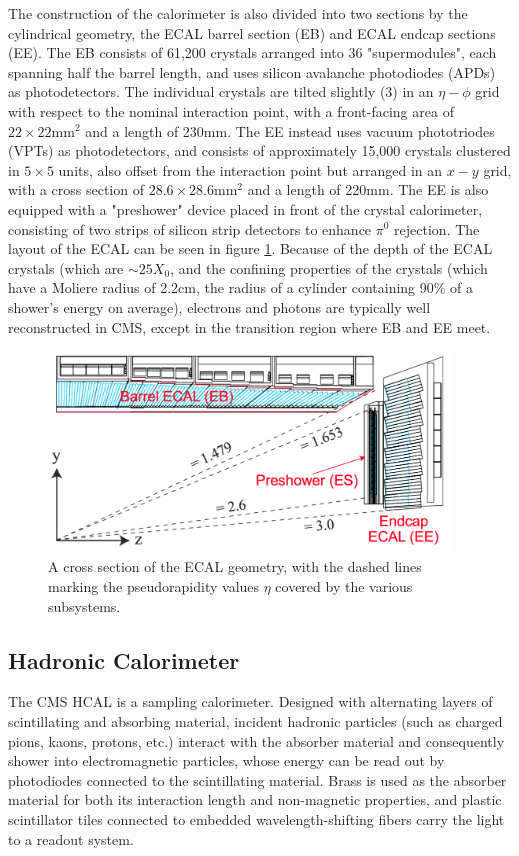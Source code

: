 The construction of the calorimeter is also divided into two sections by the cylindrical geometry, the ECAL barrel section (EB) and ECAL endcap sections (EE). The EB consists of 61,200 crystals arranged into 36 "supermodules", each spanning half the barrel length, and uses silicon avalanche photodiodes (APDs) as photodetectors. The individual crystals are tilted slightly (3\textdegree) in an $\eta-\phi$ grid with respect to the nominal interaction point, with a front-facing area of $22\times22\text{mm}^2$ and a length of 230mm. The EE instead uses vacuum phototriodes (VPTs) as photodetectors, and consists of approximately 15,000 crystals clustered in $5\times5$ units, also offset from the interaction point but arranged in an $x-y$ grid, with a cross section of $28.6\times28.6\text{mm}^2$ and a length of 220mm. The EE is also equipped with a "preshower" device placed in front of the crystal calorimeter, consisting of two strips of silicon strip detectors to enhance $\pi^0$ rejection. The layout of the ECAL can be seen in figure \ref{fig:ecalGeometry}. Because of the depth of the ECAL crystals (which are $\sim25X_0$, and the confining properties of the crystals (which have a Moliere radius of 2.2cm, the radius of a cylinder containing 90\% of a shower's energy on average), electrons and photons are typically well reconstructed in CMS, except in the transition region where EB and EE meet.
\begin{figure}
	\centering
	\includegraphics[width=0.95\textwidth]{detector/figs/ecalGeometry}
	\caption{A cross section of the ECAL geometry, with the dashed lines marking the pseudorapidity values $\eta$ covered by the various subsystems.}
	\label{fig:ecalGeometry}
\end{figure}

\subsection{Hadronic Calorimeter}
\label{subsec:hcal}
The CMS HCAL is a sampling calorimeter. Designed with alternating layers of scintillating and absorbing material, incident hadronic particles (such as charged pions, kaons, protons, etc.) interact with the absorber material and consequently shower into electromagnetic particles, whose energy can be read out by photodiodes connected to the scintillating material. Brass is used as the absorber material for both its interaction length and non-magnetic properties, and plastic scintillator tiles connected to embedded wavelength-shifting fibers carry the light to a readout system.


